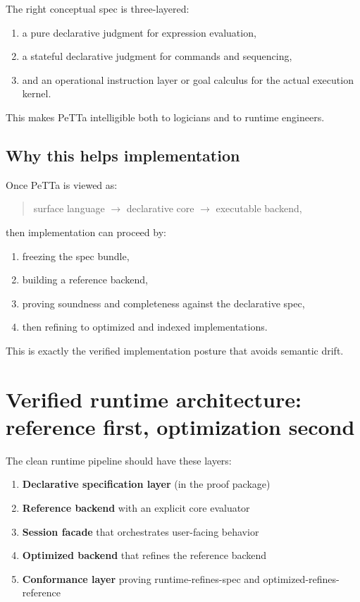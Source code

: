 \documentclass[11pt]{article}
\begin{document}
The right conceptual spec is three-layered:
\begin{enumerate}
  \item a pure declarative judgment for expression evaluation,
  \item a stateful declarative judgment for commands and sequencing,
  \item and an operational instruction layer or goal calculus for the actual execution kernel.
\end{enumerate}

This makes PeTTa intelligible both to logicians and to runtime engineers.

\subsection{Why this helps implementation}

Once PeTTa is viewed as:
\begin{quote}
surface language $\to$ declarative core $\to$ executable backend,
\end{quote}

then implementation can proceed by:
\begin{enumerate}
  \item freezing the spec bundle,
  \item building a reference backend,
  \item proving soundness and completeness against the declarative spec,
  \item then refining to optimized and indexed implementations.
\end{enumerate}

This is exactly the verified implementation posture that avoids semantic drift.

\section{Verified runtime architecture: reference first, optimization second}

The clean runtime pipeline should have these layers:

\begin{enumerate}
  \item \textbf{Declarative specification layer} (in the proof package)
  \item \textbf{Reference backend} with an explicit core evaluator
  \item \textbf{Session facade} that orchestrates user-facing behavior
  \item \textbf{Optimized backend} that refines the reference backend
  \item \textbf{Conformance layer} proving runtime-refines-spec and optimized-refines-reference
\end{enumerate}
\end{document}
